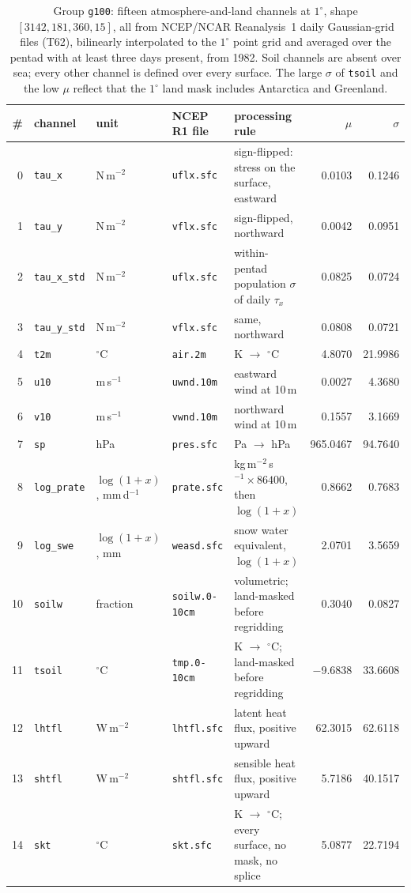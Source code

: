 \documentclass[10pt]{article}
\newcommand{\code}[1]{\texttt{#1}}
\begin{document}
\begin{table}[h]
\centering\setlength{\tabcolsep}{4pt}\footnotesize
\begin{tabular}{@{}rl>{\raggedright\arraybackslash}p{2.2cm}>{\raggedright\arraybackslash}p{2.4cm}>{\raggedright\arraybackslash}p{5.0cm}rr@{}}
\toprule
\# & channel & unit & NCEP R1 file & processing rule & $\mu$ & $\sigma$ \\
\midrule
0 & \code{tau\_x} & N\,m$^{-2}$ & \code{uflx.sfc} & sign-flipped: stress on the surface, eastward & 0.0103 & 0.1246 \\
1 & \code{tau\_y} & N\,m$^{-2}$ & \code{vflx.sfc} & sign-flipped, northward & 0.0042 & 0.0951 \\
2 & \code{tau\_x\_std} & N\,m$^{-2}$ & \code{uflx.sfc} & within-pentad population $\sigma$ of daily $\tau_x$ & 0.0825 & 0.0724 \\
3 & \code{tau\_y\_std} & N\,m$^{-2}$ & \code{vflx.sfc} & same, northward & 0.0808 & 0.0721 \\
4 & \code{t2m} & $^\circ$C & \code{air.2m} & K $\to$ $^\circ$C & 4.8070 & 21.9986 \\
5 & \code{u10} & m\,s$^{-1}$ & \code{uwnd.10m} & eastward wind at 10\,m & 0.0027 & 4.3680 \\
6 & \code{v10} & m\,s$^{-1}$ & \code{vwnd.10m} & northward wind at 10\,m & 0.1557 & 3.1669 \\
7 & \code{sp} & hPa & \code{pres.sfc} & Pa $\to$ hPa & 965.0467 & 94.7640 \\
8 & \code{log\_prate} & $\log(1{+}x)$, mm\,d$^{-1}$ & \code{prate.sfc} & kg\,m$^{-2}$\,s$^{-1}\times86400$, then $\log(1+x)$ & 0.8662 & 0.7683 \\
9 & \code{log\_swe} & $\log(1{+}x)$, mm & \code{weasd.sfc} & snow water equivalent, $\log(1+x)$ & 2.0701 & 3.5659 \\
10 & \code{soilw} & fraction & \code{soilw.0-10cm} & volumetric; land-masked before regridding & 0.3040 & 0.0827 \\
11 & \code{tsoil} & $^\circ$C & \code{tmp.0-10cm} & K $\to$ $^\circ$C; land-masked before regridding & $-$9.6838 & 33.6608 \\
12 & \code{lhtfl} & W\,m$^{-2}$ & \code{lhtfl.sfc} & latent heat flux, positive upward & 62.3015 & 62.6118 \\
13 & \code{shtfl} & W\,m$^{-2}$ & \code{shtfl.sfc} & sensible heat flux, positive upward & 5.7186 & 40.1517 \\
14 & \code{skt} & $^\circ$C & \code{skt.sfc} & K $\to$ $^\circ$C; every surface, no mask, no splice & 5.0877 & 22.7194 \\
\bottomrule
\end{tabular}
\caption{Group \code{g100}: fifteen atmosphere-and-land channels at $1^\circ$, shape $[3142,181,360,15]$, all from NCEP/NCAR Reanalysis~1 daily Gaussian-grid files (T62), bilinearly interpolated to the $1^\circ$ point grid and averaged over the pentad with at least three days present, from 1982. Soil channels are absent over sea; every other channel is defined over every surface. The large $\sigma$ of \code{tsoil} and the low $\mu$ reflect that the $1^\circ$ land mask includes Antarctica and Greenland.}
\label{tab:g100}
\end{table}
\end{document}
